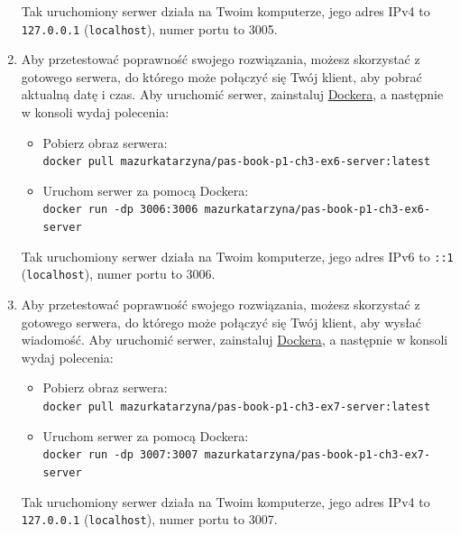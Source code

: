 \begin{enumerate}[label=\textbf{3.\arabic*}]
\noindent Tak uruchomiony serwer działa na Twoim komputerze, jego adres IPv4 to \texttt{127.0.0.1} (\texttt{localhost}), numer portu to 3005.

\item Aby przetestować poprawność swojego rozwiązania, możesz skorzystać z gotowego serwera, do którego może połączyć się Twój klient, aby pobrać aktualną datę i czas. Aby uruchomić serwer, zainstaluj \href{https://www.docker.com/}{Dockera}, a następnie w konsoli wydaj polecenia:

\begin{itemize}
\item Pobierz obraz serwera:\\ \texttt{docker pull mazurkatarzyna/pas-book-p1-ch3-ex6-server:latest}

\item Uruchom serwer za pomocą Dockera:\\ \texttt{docker run -dp 3006:3006 mazurkatarzyna/pas-book-p1-ch3-ex6-server}
\end{itemize}

\noindent Tak uruchomiony serwer działa na Twoim komputerze, jego adres IPv6 to \texttt{::1} (\texttt{localhost}), numer portu to 3006.
\item Aby przetestować poprawność swojego rozwiązania, możesz skorzystać z gotowego serwera, do którego może połączyć się Twój klient, aby wysłać wiadomość. Aby uruchomić serwer, zainstaluj \href{https://www.docker.com/}{Dockera}, a następnie w konsoli wydaj polecenia:

\begin{itemize}
\item Pobierz obraz serwera:\\ \texttt{docker pull mazurkatarzyna/pas-book-p1-ch3-ex7-server:latest}

\item Uruchom serwer za pomocą Dockera:\\ \texttt{docker run -dp 3007:3007 mazurkatarzyna/pas-book-p1-ch3-ex7-server}
\end{itemize}

\noindent Tak uruchomiony serwer działa na Twoim komputerze, jego adres IPv4 to \texttt{127.0.0.1} (\texttt{localhost}), numer portu to 3007.


\end{enumerate}

